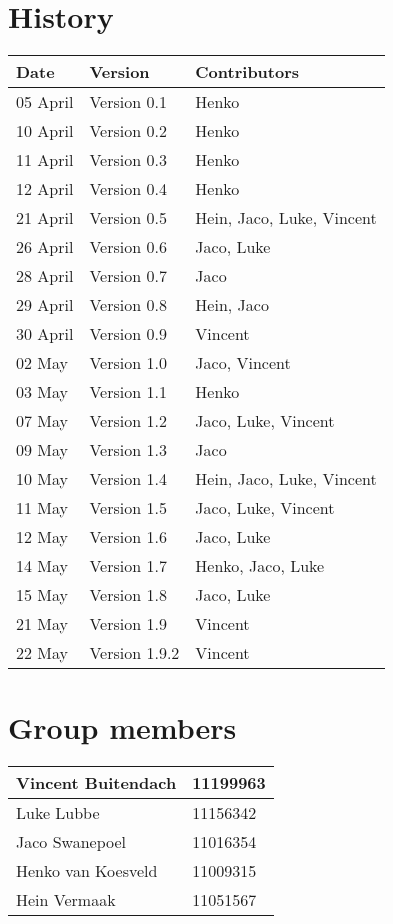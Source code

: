 
\section*{History}
\begin{center}
\begin{tabular}{|l|l|l|}
\hline
\textbf{Date} & \textbf{Version} & \textbf{Contributors}\\
\hline
05 April & Version 0.1 & Henko\\
\hline
10 April & Version 0.2 & Henko\\
\hline
11 April & Version 0.3 & Henko\\
\hline
12 April & Version 0.4 & Henko\\
\hline
21 April & Version 0.5 & Hein, Jaco, Luke, Vincent\\
\hline
26 April & Version 0.6 & Jaco, Luke\\
\hline
28 April & Version 0.7 & Jaco\\
\hline
29 April & Version 0.8 & Hein, Jaco\\
\hline
30 April & Version 0.9 & Vincent\\
\hline
02 May & Version 1.0 & Jaco, Vincent\\
\hline
03 May & Version 1.1 & Henko\\
\hline
07 May & Version 1.2 & Jaco, Luke, Vincent\\
\hline
09 May & Version 1.3 & Jaco\\
\hline
10 May & Version 1.4 & Hein, Jaco, Luke, Vincent\\
\hline
11 May & Version 1.5 & Jaco, Luke, Vincent\\
\hline
12 May & Version 1.6 & Jaco, Luke\\
\hline
14 May & Version 1.7 & Henko, Jaco, Luke\\
\hline
15 May & Version 1.8 & Jaco, Luke\\
\hline
21 May & Version 1.9 & Vincent\\
\hline
22 May & Version 1.9.2 & Vincent\\
\end{tabular}

\vfill
\section*{Group members}

\begin{tabular}{|l|l|}

\hline
Vincent Buitendach & 11199963\\
\hline
Luke Lubbe & 11156342\\
\hline
Jaco Swanepoel & 11016354\\
\hline
Henko van Koesveld & 11009315\\
\hline
Hein Vermaak & 11051567\\
\hline

\end{tabular}

\end{center}

